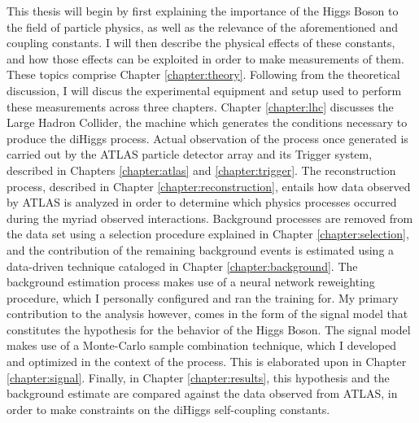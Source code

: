 This thesis will begin by first explaining the importance of the Higgs Boson to the field of particle physics,
    as well as the relevance of the aforementioned \kl and \kvv coupling constants.
I will then describe the physical effects of these constants,
    and how those effects can be exploited in order to make measurements of them.
These topics comprise Chapter \ref{chapter:theory}.
Following from the theoretical discussion,
    I will discus the experimental equipment and setup used to perform these measurements across three chapters.
Chapter \ref{chapter:lhc} discusses the Large Hadron Collider, the machine which generates the conditions necessary to produce the diHiggs process.
Actual observation of the process once generated is carried out by the ATLAS particle detector array and its Trigger system,
    described in Chapters \ref{chapter:atlas} and \ref{chapter:trigger}.
The reconstruction process, described in Chapter \ref{chapter:reconstruction},
    entails how data observed by ATLAS is analyzed in order to determine which physics processes occurred during the myriad observed interactions.
Background processes are removed from the data set using a selection procedure explained in Chapter \ref{chapter:selection},
    and the contribution of the remaining background events is estimated using a data-driven technique cataloged in Chapter \ref{chapter:background}. 
The background estimation process makes use of a neural network reweighting procedure, which I personally configured and ran the training for.
My primary contribution to the analysis however, comes in the form of the signal model that constitutes the hypothesis for the behavior of the Higgs Boson.
The signal model makes use of a Monte-Carlo sample combination technique, which I developed and optimized in the context of the \vbfproc process.
This is elaborated upon in Chapter \ref{chapter:signal}.
Finally, in Chapter \ref{chapter:results}, this hypothesis and the background estimate are compared against the data observed from ATLAS,
    in order to make constraints on the diHiggs self-coupling constants.


%
